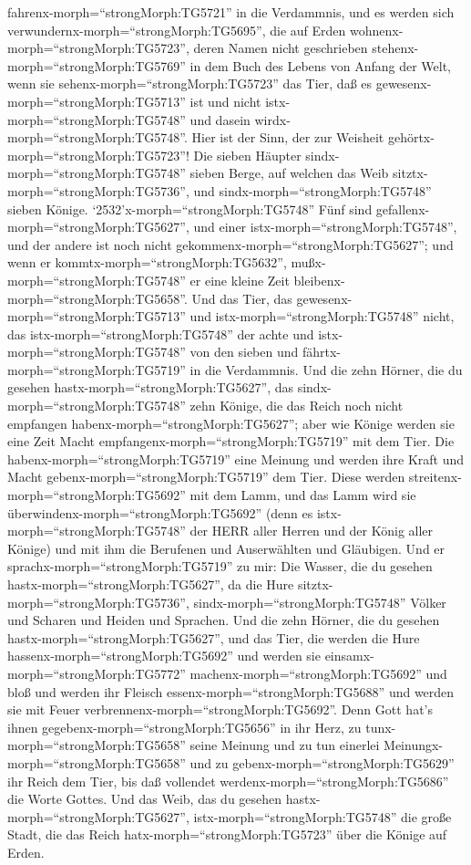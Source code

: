fahrenx-morph=``strongMorph:TG5721'' in die Verdammnis, und es werden
sich verwundernx-morph=``strongMorph:TG5695'', die auf Erden
wohnenx-morph=``strongMorph:TG5723'', deren Namen nicht geschrieben
stehenx-morph=``strongMorph:TG5769'' in dem Buch des Lebens von Anfang
der Welt, wenn sie sehenx-morph=``strongMorph:TG5723'' das Tier, daß es
gewesenx-morph=``strongMorph:TG5713'' ist und nicht
istx-morph=``strongMorph:TG5748'' und dasein
wirdx-morph=``strongMorph:TG5748''.  Hier ist der Sinn, der
zur Weisheit gehörtx-morph=``strongMorph:TG5723''! Die sieben Häupter
sindx-morph=``strongMorph:TG5748'' sieben Berge, auf welchen das Weib
sitztx-morph=``strongMorph:TG5736'', und
sindx-morph=``strongMorph:TG5748'' sieben Könige. 
`2532'x-morph=``strongMorph:TG5748'' Fünf sind
gefallenx-morph=``strongMorph:TG5627'', und einer
istx-morph=``strongMorph:TG5748'', und der andere ist noch nicht
gekommenx-morph=``strongMorph:TG5627''; und wenn er
kommtx-morph=``strongMorph:TG5632'', mußx-morph=``strongMorph:TG5748''
er eine kleine Zeit bleibenx-morph=``strongMorph:TG5658''. 
Und das Tier, das gewesenx-morph=``strongMorph:TG5713'' und
istx-morph=``strongMorph:TG5748'' nicht, das
istx-morph=``strongMorph:TG5748'' der achte und
istx-morph=``strongMorph:TG5748'' von den sieben und
fährtx-morph=``strongMorph:TG5719'' in die Verdammnis.  Und
die zehn Hörner, die du gesehen hastx-morph=``strongMorph:TG5627'', das
sindx-morph=``strongMorph:TG5748'' zehn Könige, die das Reich noch nicht
empfangen habenx-morph=``strongMorph:TG5627''; aber wie Könige werden
sie eine Zeit Macht empfangenx-morph=``strongMorph:TG5719'' mit dem
Tier.  Die habenx-morph=``strongMorph:TG5719'' eine Meinung
und werden ihre Kraft und Macht gebenx-morph=``strongMorph:TG5719'' dem
Tier.  Diese werden streitenx-morph=``strongMorph:TG5692''
mit dem Lamm, und das Lamm wird sie
überwindenx-morph=``strongMorph:TG5692'' (denn es
istx-morph=``strongMorph:TG5748'' der HERR aller Herren und der König
aller Könige) und mit ihm die Berufenen und Auserwählten und Gläubigen.
 Und er sprachx-morph=``strongMorph:TG5719'' zu mir: Die
Wasser, die du gesehen hastx-morph=``strongMorph:TG5627'', da die Hure
sitztx-morph=``strongMorph:TG5736'', sindx-morph=``strongMorph:TG5748''
Völker und Scharen und Heiden und Sprachen.  Und die zehn
Hörner, die du gesehen hastx-morph=``strongMorph:TG5627'', und das Tier,
die werden die Hure hassenx-morph=``strongMorph:TG5692'' und werden sie
einsamx-morph=``strongMorph:TG5772''
machenx-morph=``strongMorph:TG5692'' und bloß und werden ihr Fleisch
essenx-morph=``strongMorph:TG5688'' und werden sie mit Feuer
verbrennenx-morph=``strongMorph:TG5692''.  Denn Gott hat's
ihnen gegebenx-morph=``strongMorph:TG5656'' in ihr Herz, zu
tunx-morph=``strongMorph:TG5658'' seine Meinung und zu tun einerlei
Meinungx-morph=``strongMorph:TG5658'' und zu
gebenx-morph=``strongMorph:TG5629'' ihr Reich dem Tier, bis daß
vollendet werdenx-morph=``strongMorph:TG5686'' die Worte Gottes.
 Und das Weib, das du gesehen
hastx-morph=``strongMorph:TG5627'', istx-morph=``strongMorph:TG5748''
die große Stadt, die das Reich hatx-morph=``strongMorph:TG5723'' über
die Könige auf Erden.

